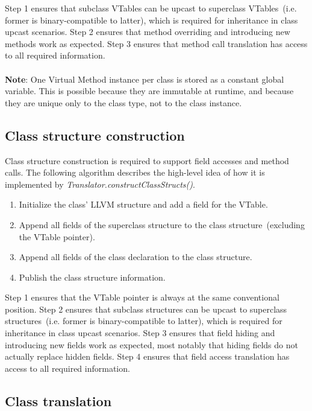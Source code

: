 \documentclass[]{tukportfolio}
\begin{document}
Step 1 ensures that subclass VTables can be upcast to superclass VTables~(i.e. former is binary-compatible to latter), which is required for inheritance in class upcast scenarios. Step 2 ensures that method overriding and introducing new methods work as expected. Step 3 ensures that method call translation has access to all required information.
\\
\\
\textbf{Note}: One Virtual Method instance per class is stored as a constant global variable. This is possible because they are immutable at runtime, and because they are unique only to the class type, not to the class instance.

\subsection{Class structure construction}
\label{subsec:classcons}

Class structure construction is required to support field accesses and method calls. The following algorithm describes the high-level idea of how it is implemented by \textit{Translator.constructClassStructs()}.

\begin{enumerate}
  \item Initialize the class' LLVM structure and add a field for the VTable.
  \item Append all fields of the superclass structure to the class structure~(excluding the VTable pointer).
  \item Append all fields of the class declaration to the class structure.
  \item Publish the class structure information.
\end{enumerate}

Step 1 ensures that the VTable pointer is always at the same conventional position. Step 2 ensures that subclass structures can be upcast to superclass structures~(i.e. former is binary-compatible to latter), which is required for inheritance in class upcast scenarios. Step 3 ensures that field hiding and introducing new fields work as expected, most notably that hiding fields do not actually replace hidden fields. Step 4 ensures that field access translation has access to all required information.

\subsection{Class translation}
\label{subsec:classtrans}
\end{document}
